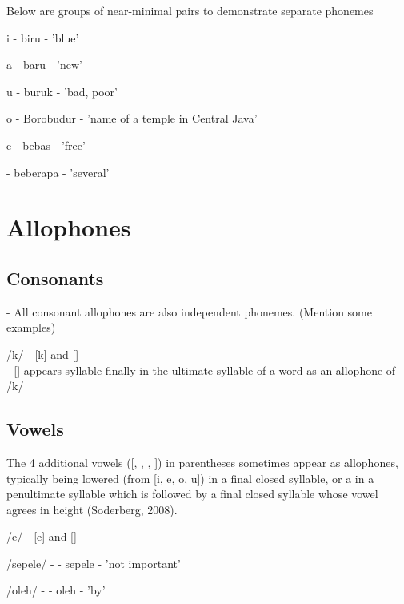 \documentclass[a4paper, 12pt]{article}
\def\HS{\space\space}
\begin{document}
Below are groups of near-minimal pairs to demonstrate separate phonemes

\medskip


i \qquad \textipa{["biru]} - biru - 'blue'

a \qquad \textipa{["baru]} - baru - 'new'

u \qquad \textipa{[bu"ruP]} - buruk - 'bad, poor'

o \qquad {} - Borobudur - 'name of a temple in Central Java'

\medskip

e \qquad \textipa{["bebas]} - bebas - 'free' 

\textschwa \qquad \textipa{[b@"brapa]} - beberapa - 'several'

\section{Allophones}

\subsection{Consonants}

- All consonant allophones are also independent phonemes. (Mention some examples)

/k/ - [k] and [\textglotstop] \\
 - [\textglotstop] \HS appears syllable finally in the ultimate syllable of a word as an allophone of /k/

\bigskip

\subsection{Vowels} 

The 4 additional vowels ([\textsci, \textepsilon, \textopeno, \textupsilon]) in parentheses sometimes appear as allophones, typically being lowered (from [i, e, o, u]) in a final closed syllable, or a in a penultimate syllable which is followed by a final closed syllable whose vowel agrees in height (Soderberg, 2008). 

\medskip


/e/ - [e] and [\textepsilon] \\ \medskip

/sepele/ - \textipa{[s@"pele]} - sepele - 'not important'

/oleh/ - \textipa{[o"lEh]} - oleh - 'by'

\medskip
\end{document}

